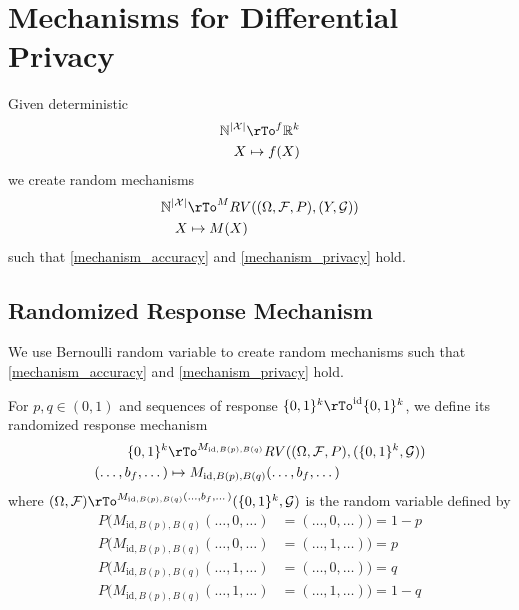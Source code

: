 \documentclass[12pt]{amsart}
\theoremstyle{definition}
\begin{document}
\section{Mechanisms for Differential Privacy} Given deterministic
\begin{align*}
\mathbb{N}^{|\mathcal{X}|} & \rTo^f \mathbb{R}^k \\
X & \mapsto f(X)
\end{align*}
we create random mechanisms
\begin{align*}
\mathbb{N}^{|\mathcal{X}|} & \rTo^M RV((\Omega, \mathcal{F}, P), (Y, \mathcal{G})) \\
X & \mapsto M(X) \\
\end{align*}
such that \ref{mechanism_accuracy} and \ref{mechanism_privacy} hold.

\subsection{Randomized Response Mechanism} \label{randomized_response_mechanism} We use Bernoulli random variable to create random mechanisms such that \ref{mechanism_accuracy} and \ref{mechanism_privacy} hold.

\dfn \label{dfn_randomized_response_mechanism} For $p, q \in (0, 1)$ and sequences of response $\{0, 1\}^k \rTo^{\text{id}} \{0, 1\}^k$, we define its randomized response mechanism
\begin{align*}
\{0, 1\}^k & \rTo^{M_{\text{id}, B(p), B(q)}} RV((\Omega, \mathcal{F}, P), (\{0, 1\}^k, \mathcal{G})) \\
(\dots , b_f, \dots) & \mapsto M_{\text{id}, B(p), B(q)}(\dots , b_f, \dots) \\
\end{align*}
where $(\Omega, \mathcal{F}) \rTo^{M_{\text{id}, B(p), B(q)}(\dots , b_f, \dots)} (\{0, 1\}^k, \mathcal{G})$ is the random variable defined by
\begin{align*}
P(M_{\text{id}, B(p), B(q)}(\dots , 0, \dots) & = (\dots , 0, \dots)) = 1 - p \\
P(M_{\text{id}, B(p), B(q)}(\dots , 0, \dots) & = (\dots , 1, \dots)) = p \\
P(M_{\text{id}, B(p), B(q)}(\dots , 1, \dots) & = (\dots , 0, \dots)) = q \\
P(M_{\text{id}, B(p), B(q)}(\dots , 1, \dots) & = (\dots , 1, \dots)) = 1 - q \\
\end{align*}
\end{document}
